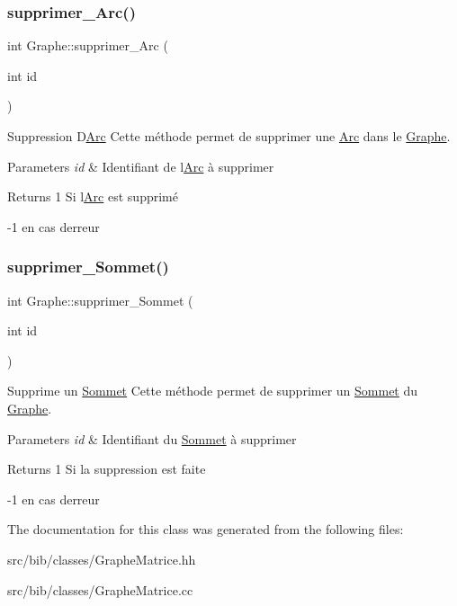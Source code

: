 \subsubsection{\texorpdfstring{supprimer\+\_\+\+Arc()}{supprimer\_Arc()}}
{\footnotesize\ttfamily int Graphe\+::supprimer\+\_\+\+Arc (\begin{DoxyParamCaption}\item[{int}]{id }\end{DoxyParamCaption})}



Suppression D\textquotesingle{}\hyperlink{classArc}{Arc} Cette m\'{e}thode permet de supprimer une \hyperlink{classArc}{Arc} dans le \hyperlink{classGraphe}{Graphe}. 


\begin{DoxyParams}{Parameters}
{\em id} & Identifiant de l\textquotesingle{}\hyperlink{classArc}{Arc} \`{a} supprimer \\
\hline
\end{DoxyParams}
\begin{DoxyReturn}{Returns}
1 Si l\textquotesingle{}\hyperlink{classArc}{Arc} est supprim\'{e} 

-\/1 en cas d\textquotesingle{}erreur 
\end{DoxyReturn}
\mbox{\label{classGraphe_a8e0efe2e1804f5b9cc02ffc40bb34fcd}} 
\subsubsection{\texorpdfstring{supprimer\+\_\+\+Sommet()}{supprimer\_Sommet()}}
{\footnotesize\ttfamily int Graphe\+::supprimer\+\_\+\+Sommet (\begin{DoxyParamCaption}\item[{int}]{id }\end{DoxyParamCaption})}



Supprime un \hyperlink{classSommet}{Sommet} Cette m\'{e}thode permet de supprimer un \hyperlink{classSommet}{Sommet} du \hyperlink{classGraphe}{Graphe}. 


\begin{DoxyParams}{Parameters}
{\em id} & Identifiant du \hyperlink{classSommet}{Sommet} \`{a} supprimer \\
\hline
\end{DoxyParams}
\begin{DoxyReturn}{Returns}
1 Si la suppression est faite 

-\/1 en cas d\textquotesingle{}erreur 
\end{DoxyReturn}


The documentation for this class was generated from the following files\+:\begin{DoxyCompactItemize}
\item 
src/bib/classes/Graphe\+Matrice.\+hh\item 
src/bib/classes/Graphe\+Matrice.\+cc\end{DoxyCompactItemize}
